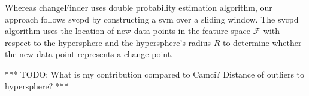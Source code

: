 Whereas \gls{changeFinder} uses double probability estimation algorithm, our approach follows \gls{svcpd} by constructing a \gls{svm} over a sliding window.
The \gls{svcpd} algorithm uses the location of new data points in the feature space $\mathcal{F}$ with respect to the hypersphere and the hypersphere's radius $R$ to determine whether the new data point represents a change point.

*** TODO: What is my contribution compared to Camci? Distance of outliers to hypersphere? ***